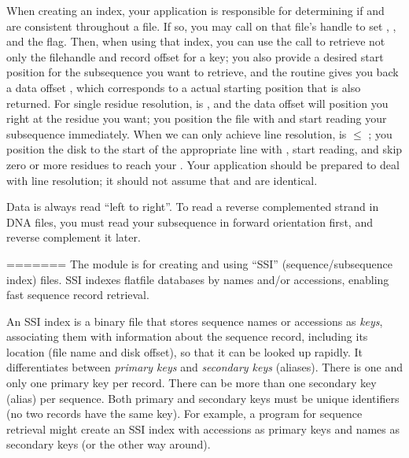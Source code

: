 When creating an index, your application is responsible for
determining if  and  are consistent throughout a
file. If so, you may call  on that
file's handle to set , , and the
 flag. Then, when using that index, you can
use the  call to retrieve not only the
filehandle  and record offset  for a key; you
also provide a desired start position  for the
subsequence you want to retrieve, and the routine gives you back a
data offset , which corresponds to a actual starting
position  that is also returned. For single
residue resolution,  is ,
and the data offset  will position you right at the
residue you want; you position the file with  and
start reading your subsequence immediately. When we can only achieve
line resolution,  is $\leq$
; you position the disk to the start of the
appropriate line with , start reading, and skip zero
or more residues to reach your . Your
application should be prepared to deal with line resolution; it should
not assume that  and  are
identical.

Data is always read ``left to right''.  To read a reverse complemented
strand in DNA files, you must read your subsequence in forward
orientation first, and reverse complement it later.



=======
The  module is for creating and using ``SSI''
(sequence/subsequence index) files. SSI indexes flatfile databases by
names and/or accessions, enabling fast sequence record retrieval. 

An SSI index is a binary file that stores sequence names or accessions
as \emph{keys}, associating them with information about the sequence
record, including its location (file name and disk offset), so that it
can be looked up rapidly. It differentiates between \emph{primary
keys} and \emph{secondary keys} (aliases).  There is one and only one
primary key per record. There can be more than one secondary key
(alias) per sequence. Both primary and secondary keys must be unique
identifiers (no two records have the same key). For example, a program
for sequence retrieval might create an SSI index with accessions as
primary keys and names as secondary keys (or the other way around).

